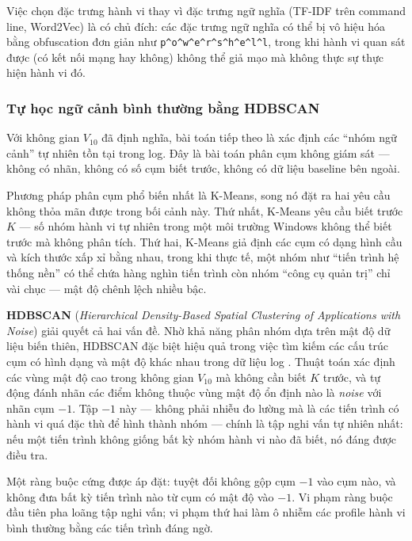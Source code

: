 \documentclass[../main.tex]{subfiles}
\begin{document}
Việc chọn đặc trưng hành vi thay vì đặc trưng ngữ nghĩa (TF-IDF trên command line, Word2Vec) là có chủ đích: các đặc trưng ngữ nghĩa có thể bị vô hiệu hóa bằng obfuscation đơn giản như \texttt{p\^{}o\^{}w\^{}e\^{}r\^{}s\^{}h\^{}e\^{}l\^{}l}, trong khi hành vi quan sát được (có kết nối mạng hay không) không thể giả mạo mà không thực sự thực hiện hành vi đó.

\subsubsection{Tự học ngữ cảnh bình thường bằng HDBSCAN}
\label{subsubsection:2.4.3.2}

Với không gian $V_{10}$ đã định nghĩa, bài toán tiếp theo là xác định các ``nhóm ngữ cảnh'' tự nhiên tồn tại trong log. Đây là bài toán phân cụm không giám sát — không có nhãn, không có số cụm biết trước, không có dữ liệu baseline bên ngoài.

Phương pháp phân cụm phổ biến nhất là K-Means, song nó đặt ra hai yêu cầu không thỏa mãn được trong bối cảnh này. Thứ nhất, K-Means yêu cầu biết trước $K$ — số nhóm hành vi tự nhiên trong một môi trường Windows không thể biết trước mà không phân tích. Thứ hai, K-Means giả định các cụm có dạng hình cầu và kích thước xấp xỉ bằng nhau, trong khi thực tế, một nhóm như ``tiến trình hệ thống nền'' có thể chứa hàng nghìn tiến trình còn nhóm ``công cụ quản trị'' chỉ vài chục — mật độ chênh lệch nhiều bậc.

\textbf{HDBSCAN} (\textit{Hierarchical Density-Based Spatial Clustering of Applications with Noise}) giải quyết cả hai vấn đề. Nhờ khả năng phân nhóm dựa trên mật độ dữ liệu biến thiên, HDBSCAN đặc biệt hiệu quả trong việc tìm kiếm các cấu trúc cụm có hình dạng và mật độ khác nhau trong dữ liệu log \cite{logctbl2025}. Thuật toán xác định các vùng mật độ cao trong không gian $V_{10}$ mà không cần biết $K$ trước, và tự động đánh nhãn các điểm không thuộc vùng mật độ ổn định nào là \textit{noise} với nhãn cụm $-1$. Tập $-1$ này — không phải nhiễu đo lường mà là các tiến trình có hành vi quá đặc thù để hình thành nhóm — chính là tập nghi vấn tự nhiên nhất: nếu một tiến trình không giống bất kỳ nhóm hành vi nào đã biết, nó đáng được điều tra.

Một ràng buộc cứng được áp đặt: tuyệt đối không gộp cụm $-1$ vào cụm nào, và không đưa bất kỳ tiến trình nào từ cụm có mật độ vào $-1$. Vi phạm ràng buộc đầu tiên pha loãng tập nghi vấn; vi phạm thứ hai làm ô nhiễm các profile hành vi bình thường bằng các tiến trình đáng ngờ.
\end{document}
